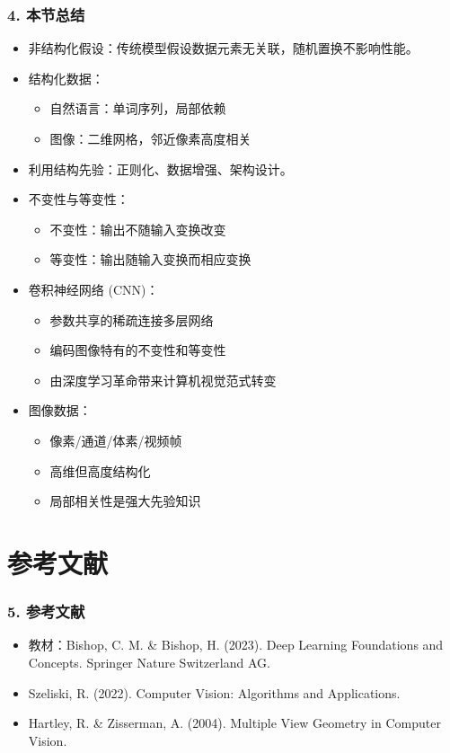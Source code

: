 \documentclass[t,aspectratio=169]{beamer} %
\begin{document}
\begin{frame}
    \frametitle{4. 本节总结}
    \begin{itemize}
        \item \alert{非结构化假设}：传统模型假设数据元素无关联，随机置换不影响性能。
        \item \alert{结构化数据}：
        \begin{itemize}
            \item 自然语言：单词序列，局部依赖
            \item 图像：二维网格，邻近像素高度相关
        \end{itemize}
        \item \alert{利用结构先验}：正则化、数据增强、架构设计。
        \item \alert{不变性与等变性}：
        \begin{itemize}
            \item 不变性：输出不随输入变换改变
            \item 等变性：输出随输入变换而相应变换
        \end{itemize}
        \item \alert{卷积神经网络 (CNN)}：
        \begin{itemize}
            \item 参数共享的稀疏连接多层网络
            \item 编码图像特有的不变性和等变性
            \item 由深度学习革命带来计算机视觉范式转变
        \end{itemize}
        \item \alert{图像数据}：
        \begin{itemize}
            \item 像素/通道/体素/视频帧
            \item 高维但高度结构化
            \item 局部相关性是强大先验知识
        \end{itemize}
    \end{itemize}
\end{frame}

\section{参考文献}

\begin{frame}
    \frametitle{5. 参考文献}
    \begin{itemize}
        \item 教材：Bishop, C. M. \& Bishop, H. (2023). Deep Learning Foundations and Concepts. Springer Nature Switzerland AG.
        \item Szeliski, R. (2022). Computer Vision: Algorithms and Applications.
        \item Hartley, R. \& Zisserman, A. (2004). Multiple View Geometry in Computer Vision.
    \end{itemize}
\end{frame}
\end{document}
